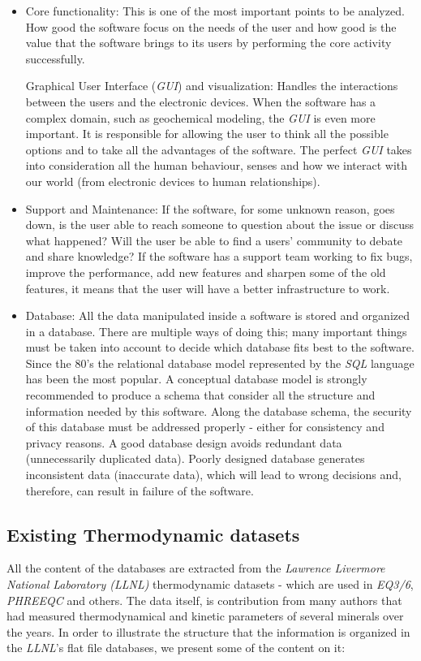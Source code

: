 \documentclass[ppgc,mestrado,English]{iiufrgs}
\begin{document}
\begin{itemize}
\item Core functionality: This is one of the most important points to be analyzed. How good the software focus on the needs of the user and how good is the value that the software brings to its users by performing the core activity successfully.

Graphical User Interface (\emph{GUI}) and visualization: Handles the interactions between the users and the electronic devices. When the software has a complex domain, such as geochemical modeling, the \emph{GUI} is even more important. It is responsible for allowing the user to think all the possible options and to take all the advantages of the software. The perfect \emph{GUI} takes into consideration all the human behaviour, senses and how we interact with our world (from electronic devices to human relationships).

\item Support and Maintenance: If the software, for some unknown reason, goes down, is the user able to reach someone to question about the issue or discuss what happened? Will the user be able to find a users' community to debate and share knowledge? If the software has a support team working to fix bugs, improve the performance, add new features and sharpen some of the old features, it means that the user will have a better infrastructure to work.

\item Database: All the data manipulated inside a software is stored and organized in a database. There are multiple ways of doing this; many important things must be taken into account to decide which database fits best to the software. Since the 80's the relational database model represented by the \emph{SQL} language has been the most popular. A conceptual database model is strongly recommended to produce a schema that consider all the structure and information needed by this software. Along the database schema, the security of this database must be addressed properly - either for consistency and privacy reasons. A good database design avoids redundant data (unnecessarily duplicated data). Poorly designed database generates inconsistent data (inaccurate data), which will lead to wrong decisions and, therefore, can result in failure of the software.
\end{itemize}


\subsection{Existing Thermodynamic datasets}
All the content of the databases are extracted from the \emph{Lawrence Livermore National Laboratory (LLNL)} thermodynamic datasets - which are used in \emph{EQ3/6}, \emph{PHREEQC} and others. The data itself, is contribution from many authors that had measured thermodynamical and kinetic parameters of several minerals over the years. In order to illustrate the structure that the information is organized in the \emph{LLNL}'s flat file databases, we present some of the content on it:
\end{document}
